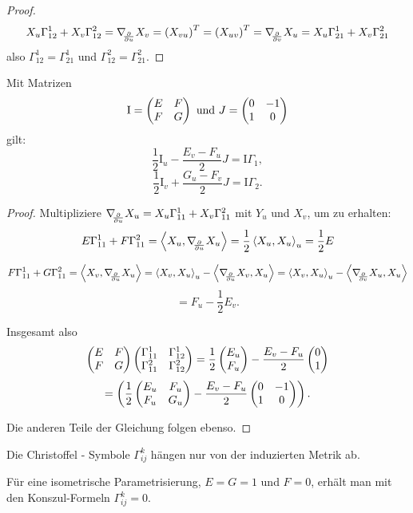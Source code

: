 \begin{proof}
	
		\[ X_u\Gamma_{12}^1 + X_v \Gamma_{12}^2 = \nabla_{\!\!{\partial\over \partial u}}X_v = \left( X_{vu} \right)^T = \left( X_{uv} \right)^T = \nabla_{\!\!{\partial\over \partial v}}X_u = X_u\Gamma_{21}^1 + X_v\Gamma_{21}^2   \]
	also $ \Gamma_{12}^1 = \Gamma_{21}^1 $ und $ \Gamma_{12}^2 = \Gamma_{21}^2 $.
\end{proof}

\begin{theorem}
	
	Mit Matrizen 
		\[ \mathrm I = \begin{pmatrix} E &F \\ F &G \end{pmatrix} \text{ und } J = \begin{pmatrix} 0 &-1 \\ 1 & 0  \end{pmatrix} \]
	gilt: 
		\[ \frac12 \mathrm I_u - \frac{E_v - F_u}{2}J = \mathrm I\Gamma_1, \]
		\[ \frac12 \mathrm I_v + \frac{G_u - F_v}{2}J = \mathrm I\Gamma_2. \]
		
\end{theorem}

\begin{proof}
	
	Multipliziere $ \nabla_{\!\!{\partial\over \partial u}}X_u = X_u\Gamma_{11}^1 + X_v\Gamma_{11}^2 $ mit $ Y_u $ und $ X_v $, um zu erhalten:
		\[ E \Gamma_{11}^1 + F \Gamma_{11}^2 = \left \langle X_u, \nabla_{\!\!{\partial\over \partial u}}X_u \right\rangle = \frac12 \left \langle X_u,X_u \right\rangle_u = \frac12 E \]
	
		\[ F\Gamma_{11}^1 + G \Gamma_{11}^2 = \left \langle X_v, \nabla_{\!\!{\partial\over \partial u}}X_u \right\rangle = \left \langle X_v,X_u \right\rangle_u - \left \langle \nabla_{\!\!{\partial\over \partial u}}X_v,X_u \right\rangle = \left \langle X_v,X_u \right\rangle_u - \left \langle \nabla_{\!\!{\partial\over \partial v}}X_u,X_u \right\rangle \]
		\[ = F_u - \frac12 E_v. \]
	
	Insgesamt also
		\[ \begin{pmatrix} E &F \\F &G \end{pmatrix} \begin{pmatrix} \Gamma_{11}^1 & \Gamma_{12}^1 \\ \Gamma_{11}^2 & \Gamma_{12}^2 \end{pmatrix} = \frac12 \begin{pmatrix} E_u \\ F_u \end{pmatrix} - \dfrac{E_v - F_u}{2} \begin{pmatrix} 0 \\ 1 \end{pmatrix} \]
		\[ = \left( \frac12 \begin{pmatrix} E_u & F_u \\ F_u & G_u \end{pmatrix} - \dfrac{E_v - F_u}{2} \begin{pmatrix} 0 &-1 \\ 1 & 0  \end{pmatrix} \right).  \]
	
	Die anderen Teile der Gleichung  folgen ebenso.
	
\end{proof}

\begin{corollary}
	Die Christoffel - Symbole $ \Gamma_{ij}^k $ hängen nur von der induzierten Metrik ab.
\end{corollary}

\begin{example}
	
	Für eine isometrische Parametrisierung, $  E = G = 1 $ und $  F = 0 $, erhält man mit den Konszul-Formeln $ \Gamma_{ij}^k = 0 $.
	
\end{example}



